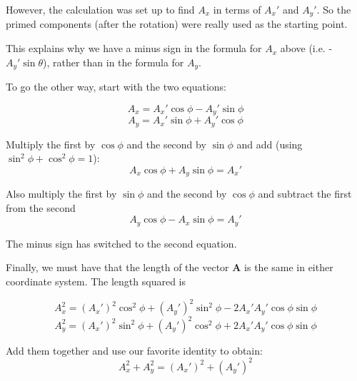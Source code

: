 \documentclass[11pt, oneside]{article}
\begin{document}
However, the calculation was set up to find $A_x$ in terms of $A_x'$ and $A_y'$.  So the primed components (after the rotation) were really used as the starting point.  

This explains why we have a minus sign in the formula for $A_x$ above (i.e. - $A_y' \sin \theta$), rather than in the formula for $A_y$.

To go the other way, start with the two equations:

\[ A_x = A_x' \cos \phi - A_y' \sin \phi \]
\[ A_y = A_x' \sin \phi + A_y' \cos \phi \]

Multiply the first by $\cos \phi$ and the second by $\sin \phi$ and add (using $\sin^2 \phi + \cos^2 \phi = 1$):
\[ A_x \cos \phi + A_y \sin \phi = A_x' \]

Also multiply the first by $\sin \phi$ and the second by $\cos \phi$ and subtract the first from the second
\[ A_y \cos \phi - A_x \sin \phi = A_y' \]

The minus sign has switched to the second equation.

Finally, we must have that the length of the vector $\mathbf{A}$ is the same in either coordinate system.  The length squared is

\[ A_x^2 = (A_x')^2 \cos^2 \phi + (A_y')^2 \sin^2 \phi - 2 A_x' A_y' \cos \phi \sin \phi \]
\[ A_y^2 = (A_x')^2 \sin^2 \phi + (A_y')^2 \cos^2 \phi + 2 A_x' A_y' \cos \phi \sin \phi \]

Add them together and use our favorite identity to obtain:
\[ A_x^2 + A_y^2 = (A_x')^2 +  (A_y')^2 \]
\end{document}
